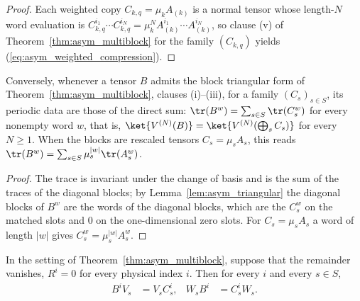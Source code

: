\begin{proof}
    \leanok
    Each weighted copy $C_{k,q}=\mu_kA_{(k)}$ is a normal tensor whose
    length-$N$ word evaluation is
    $C_{k,q}^{i_1}\cdots C_{k,q}^{i_N}=\mu_k^NA_{(k)}^{i_1}\cdots
        A_{(k)}^{i_N}$, so clause (v) of Theorem~\ref{thm:asym_multiblock}
    for the family $(C_{k,q})$ yields
    (\ref{eq:asym_weighted_compression}).
\end{proof}


\begin{lemma}
    \label{prop:asym_compression_trace}
    \leanok
    Conversely, whenever a tensor $B$ admits the block triangular form of
    Theorem~\ref{thm:asym_multiblock}, clauses (i)--(iii), for a family
    $(C_s)_{s\in S}$, its periodic data are those of the direct sum:
    $\tr(B^w)=\sum_{s\in S}\tr(C_s^w)$ for every nonempty word $w$, that
    is, $\ket{V^{(N)}(B)}=\ket{V^{(N)}(\bigoplus_sC_s)}$ for every $N\geq1$.
    When the blocks are rescaled tensors $C_s=\mu_sA_s$, this reads
    $\tr(B^w)=\sum_{s\in S}\mu_s^{|w|}\tr(A_s^w)$.
\end{lemma}

\begin{proof}
    \leanok
    The trace is invariant under the change of basis and is the sum of the
    traces of the diagonal blocks; by Lemma~\ref{lem:asym_triangular} the
    diagonal blocks of $B^w$ are the words of the diagonal blocks, which are
    the $C_s^w$ on the matched slots and $0$ on the one-dimensional zero
    slots. For $C_s=\mu_sA_s$ a word of length $|w|$ gives
    $C_s^w=\mu_s^{|w|}A_s^w$.
\end{proof}

\begin{corollary}
    \label{prop:asym_split_intertwiners}
    \leanok
    In the setting of Theorem~\ref{thm:asym_multiblock}, suppose that the
    remainder vanishes, $R^i=0$ for every physical index $i$. Then for
    every $i$ and every $s\in S$,
    \begin{align}
        B^iV_s & =V_sC_s^i, &
        W_sB^i & =C_s^iW_s.
    \end{align}
\end{corollary}

